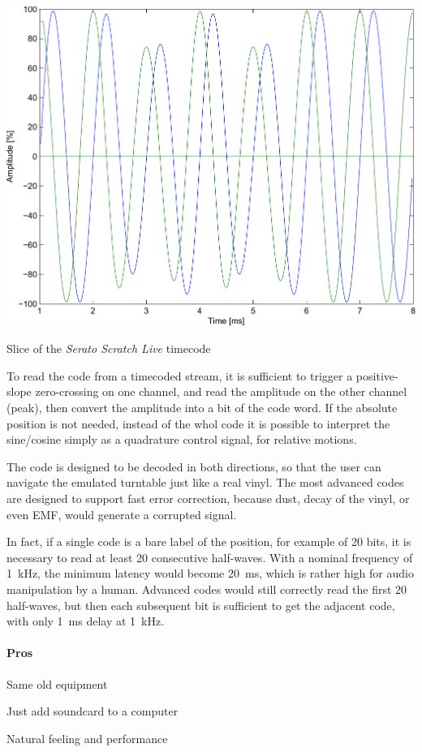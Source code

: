 \documentclass[a4paper,10pt]{article}
\makeatletter
\newenvironment{figurehere}{\def\@captype{figure}\vspace{2ex}}{\vspace{2ex}}
\makeatother
\begin{document}
\begin{multicols}{2}
\begin{figurehere}
	\label{fig:serato_timecode_slice}
	\centering
	\includegraphics[keepaspectratio=true,width=\columnwidth]{images/serato_timecode_slice.pdf}
	\caption{Slice of the \emph{Serato Scratch Live} timecode}
\end{figurehere}

To read the code from a timecoded stream, it is sufficient to trigger a
positive-slope zero-crossing on one channel, and read the amplitude on the
other channel (peak), then convert the amplitude into a bit of the code
word. If the absolute position is not needed, instead of the whol code it
is possible to interpret the sine/cosine simply as a quadrature control
signal, for relative motions.

The code is designed to be decoded in both directions, so that the user can
navigate the emulated turntable just like a real vinyl. The most advanced
codes are designed to support fast error correction, because dust, decay of
the vinyl, or even EMF, would generate a corrupted signal.

In fact, if a single code is a bare label of the position, for example of 20
bits, it is necessary to read at least 20 consecutive half-waves. With a
nominal frequency of 1~kHz, the minimum latency would become 20~ms, which is
rather high for audio manipulation by a human. Advanced codes would still
correctly read the first 20 half-waves, but then each subsequent bit is
sufficient to get the adjacent code, with only 1~ms delay at 1~kHz.


\paragraph{Pros}
\begin{itemize*}
	\item Same old equipment
	\item Just add soundcard to a computer
	\item Natural feeling and performance
\end{itemize*}



\end{multicols}
\end{document}
